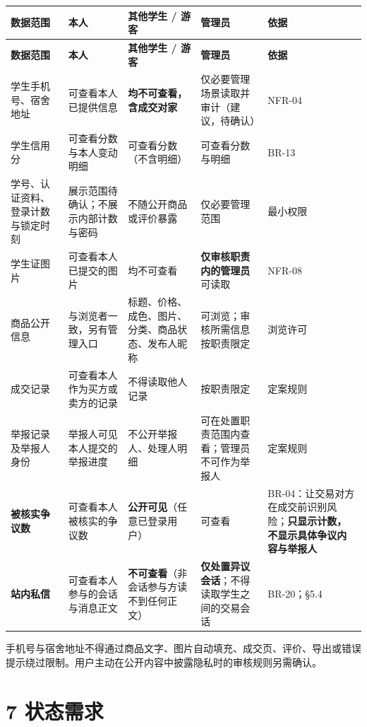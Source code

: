 \documentclass[12pt,a4paper]{ctexart}
\begin{document}
{\scriptsize
\begin{longtable}{|p{2.54cm}|p{2.65cm}|p{3.35cm}|p{3.06cm}|p{4.40cm}|}
\hline
\textbf{数据范围} & \textbf{本人} & \textbf{其他学生 / 游客} & \textbf{管理员} & \textbf{依据} \\
\hline
\endfirsthead
\hline
\textbf{数据范围} & \textbf{本人} & \textbf{其他学生 / 游客} & \textbf{管理员} & \textbf{依据} \\
\hline
\endhead
\hline
\endfoot
学生手机号、宿舍地址 & 可查看本人已提供信息 & \textbf{均不可查看，含成交对家} & 仅必要管理场景读取并审计（建议，待确认） & NFR-04 \\
\hline
学生信用分 & 可查看分数与本人变动明细 & 可查看分数（不含明细） & 可查看分数与明细 & BR-13 \\
\hline
学号、认证资料、登录计数与锁定时刻 & 展示范围待确认；不展示内部计数与密码 & 不随公开商品或评价暴露 & 仅必要管理范围 & 最小权限 \\
\hline
学生证图片 & 可查看本人已提交的图片 & 均不可查看 & \textbf{仅审核职责内的管理员}可读取 & NFR-08 \\
\hline
商品公开信息 & 与浏览者一致，另有管理入口 & 标题、价格、成色、图片、分类、商品状态、发布人昵称 & 可浏览；审核所需信息按职责限定 & 浏览许可 \\
\hline
成交记录 & 可查看本人作为买方或卖方的记录 & 不得读取他人记录 & 按职责限定 & 定案规则 \\
\hline
举报记录及举报人身份 & 举报人可见本人提交的举报进度 & 不公开举报人、处理人明细 & 可在处置职责范围内查看；管理员不可作为举报人 & 定案规则 \\
\hline
\textbf{被核实争议数} & 可查看本人被核实的争议数 & \textbf{公开可见}（任意已登录用户） & 可查看 & BR-04：让交易对方在成交前识别风险；\textbf{只显示计数，不显示具体争议内容与举报人} \\
\hline
\textbf{站内私信} & 可查看本人参与的会话与消息正文 & \textbf{不可查看}（非会话参与方读不到任何正文） & \textbf{仅处置异议会话}；不得读取学生之间的交易会话 & BR-20；§5.4 \\
\hline
\end{longtable}
}


手机号与宿舍地址不得通过商品文字、图片自动填充、成交页、评价、导出或错误提示绕过限制。用户主动在公开内容中披露隐私时的审核规则另需确认。



\section*{7 状态需求}
\end{document}
